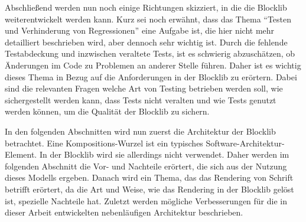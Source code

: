 Abschließend werden nun noch einige Richtungen skizziert, in die die Blocklib weiterentwickelt werden kann. Kurz sei noch erwähnt, dass das Thema \enquote{Testen und Verhinderung von Regressionen} eine Aufgabe ist, die hier nicht mehr detailliert beschrieben wird, aber dennoch sehr wichtig ist. Durch die fehlende Testabdeckung und inzwischen veraltete Tests, ist es schwierig abzuschätzen, ob Änderungen im Code zu Problemen an anderer Stelle führen. Daher ist es wichtig dieses Thema in Bezug auf die Anforderungen in der Blocklib zu erörtern. Dabei sind die relevanten Fragen welche Art von Testing betrieben werden soll, wie sichergestellt werden kann, dass Tests nicht veralten und wie Tests genutzt werden können, um die Qualität der Blocklib zu sichern.

In den folgenden Abschnitten wird nun zuerst die Architektur der Blocklib betrachtet. Eine Kompositions-Wurzel ist ein typisches Software-Architektur-Element. In der Blocklib wird sie allerdings nicht verwendet. Daher werden im folgenden Abschnitt die Vor- und Nachteile erörtert, die sich aus der Nutzung dieses Modells ergeben. Danach wird ein Thema, das das Rendering von Schrift betrifft erörtert, da die Art und Weise, wie das Rendering in der Blocklib gelöst ist, spezielle Nachteile hat. Zuletzt werden mögliche Verbesserungen für die in dieser Arbeit entwickelten nebenläufigen Architektur beschrieben.